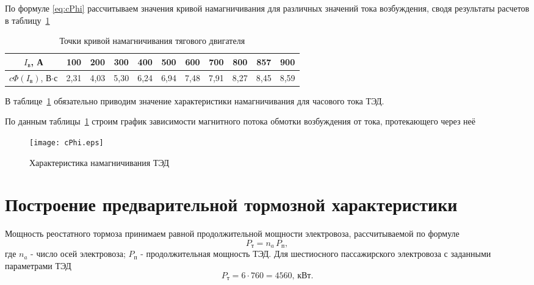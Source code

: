 По формуле \eqref{eq:cPhi} рассчитываем значения кривой намагничивания для различных значений тока возбуждения, сводя результаты расчетов в таблицу~\ref{tab:tab_cPhi}

\begin{table}[H]
 \centering
 \caption{Точки кривой намагничивания тягового двигателя}
 \begin{tabular}{|c||c|c|c|c|c|c|c|c|c|c|}
  \hline
  $I_{\text{в}}$, А & 100 & 200 & 300 & 400 & 500 & 600 & 700 & 800 & 857 & 900 \\ \hline
  $c\Phi(I_{\text{в}})$, В$\cdot$с & 2,31 & 4,03 & 5,30 & 6,24 & 6,94 & 7,48 & 7,91 & 8,27 & 8,45 & 8,59  \\ \hline
 \end{tabular}
 \label{tab:tab_cPhi}
\end{table}
В таблице~\ref{tab:tab_cPhi} обязательно приводим значение характеристики намагничивания для часового тока ТЭД.

По данным таблицы~\ref{tab:tab_cPhi} строим график зависимости магнитного потока обмотки возбуждения от тока, протекающего через неё
\begin{figure}[H]
    \centering    
    \texttt{[image: cPhi.eps]}
    \caption{Характеристика намагничивания ТЭД}
    \label{fig:cPhi}
\end{figure}

\section{Построение предварительной тормозной характеристики}

Мощность реостатного тормоза принимаем равной продолжительной мощности электровоза, рассчитываемой по формуле
\begin{equation}
 \label{eq:power_reostat}
 P_{\text{т}} = n_a \, P_{\text{п}},
\end{equation}
где $n_a$ - число осей электровоза; $P_{\text{п}}$ - продолжительная мощность ТЭД. Для шестиосного пассажирского электровоза с заданными параметрами ТЭД
\begin{equation*}
 P_{\text{т}} = 6 \cdot 760 = 4560, \, \text{кВт}.
\end{equation*}

